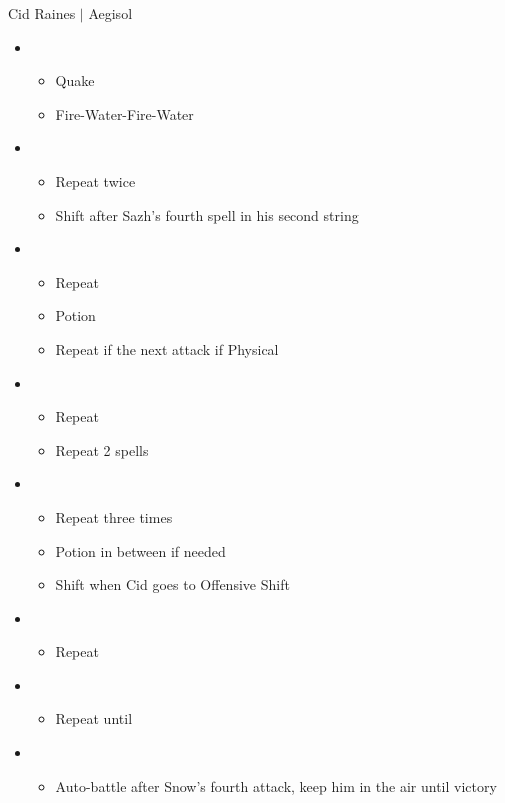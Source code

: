\begin{battle}{Cid Raines $|$ Aegisol}
\begin{multicols}{2}
\begin{itemize}
\begin{itemize}
    \end{itemize}
\end{itemize}
\columnbreak
\begin{itemize}
    \item \first
    \begin{itemize}
        \item Quake
        \item Fire-Water-Fire-Water
    \end{itemize}
    \item \third
    \begin{itemize}
        \item Repeat twice
        \item Shift after Sazh's fourth spell in his second string
    \end{itemize}
    \item \fourth
    \begin{itemize}
        \item Repeat
        \item Potion
        \item Repeat if the next attack if Physical
    \end{itemize}
    \item \fifth
    \begin{itemize}
        \item Repeat
        \item Repeat 2 spells
    \end{itemize}
    \item \second
    \begin{itemize}
        \item Repeat three times
        \item Potion in between if needed
        \item Shift when Cid goes to Offensive Shift
    \end{itemize}
    \item \third
    \begin{itemize}
        \item Repeat
    \end{itemize}
    \item \second
    \begin{itemize}
        \item Repeat until \stagger
    \end{itemize}
    \item \sixth
    \begin{itemize}
        \item Auto-battle after Snow's fourth attack, keep him in the air until victory
    \end{itemize}
\end{itemize}
\end{multicols}
\end{battle}

